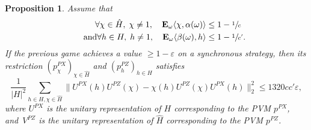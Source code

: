 \documentclass[JEP,XML,SOM,Unicode,published]{cedram}
\theoremstyle{plain}
\newtheorem{proposition}[theorem]{Proposition}
\theoremstyle{definition}
\newcommand{\E}{\mathbf{E}}
\begin{document}
\begin{proposition}\label{prop:construction_of_game} Assume that
\begin{align*}
\forall \chi \in \hat H,\;\chi\neq1,\quad \E_\omega \langle \chi, \alpha(\omega)\rangle &\leq 1-\sfrac 1 c
\\
\tag*{and}
\forall h \in H,\;h\neq1,\quad \E_\omega \langle \beta(\omega),h\rangle &\leq 1-\sfrac 1 {c'}.
\end{align*}
If the previous game achieves a value $\geq 1-\varepsilon$ on a synchronous strategy, then its restriction $(p^{PX}_\chi)_{\chi \in \hat H}$ and $(p^{PZ}_h)_{h \in H}$ satisfies
\[
\frac{1}{|H|^2} \sum_{h\in H,\chi \in \hat H}\bigl\|U^{PX}(h) U^{PZ}(\chi) - \chi(h) U^{PZ}(\chi) U^{PX}(h)\bigr\|_2^2 \leq 1320 cc' \varepsilon,
\]
where $U^{PX}$ is the unitary representation of $H$ corresponding to the PVM $p^{PX}$, and~$V^{PZ}$ is the unitary representation of $\hat H$ corresponding to the PVM $p^{PZ}$.
\end{proposition}
\end{document}
